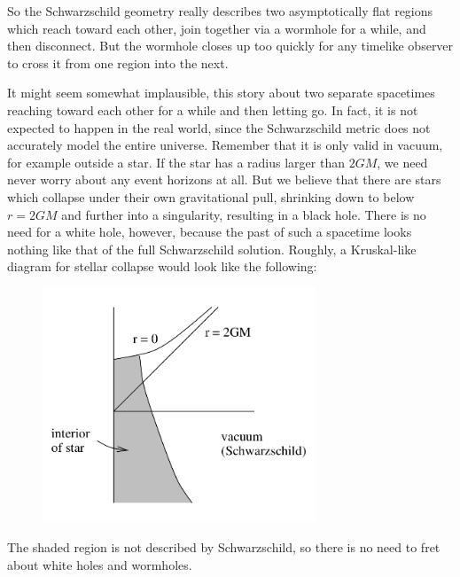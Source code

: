 \documentclass[12pt]{article}
\begin{document}
\noindent
So the Schwarzschild geometry really describes two asymptotically
flat regions which reach toward each other, join together via a
wormhole for a while, and then disconnect.  But the wormhole
closes up too quickly for any timelike observer to cross it from one
region into the next.

It might seem somewhat implausible, this story about two separate
spacetimes reaching toward each other for a while and then letting
go.  In fact, it is not expected to happen in the real world, since
the Schwarzschild metric does not accurately model the entire 
universe.  Remember that it is only valid in vacuum, for example
outside a star.  If the star has a radius larger than $2GM$, we
need never worry about any event horizons at all.  But we believe
that there are stars which collapse under their own gravitational
pull, shrinking down to below $r=2GM$ and further into a singularity,
resulting in a black hole.  There is no need for a white hole, however,
because the past of such a spacetime looks nothing like that of the
full Schwarzschild solution.  Roughly, a Kruskal-like diagram for
stellar collapse would look like the following:

\begin{figure}[h]
  \centerline{
  \includegraphics[height=7cm]{pdf/seven18}}
\end{figure}

\noindent  The shaded region is not described by Schwarzschild, so
there is no need to fret about white holes and wormholes. 
\end{document}
